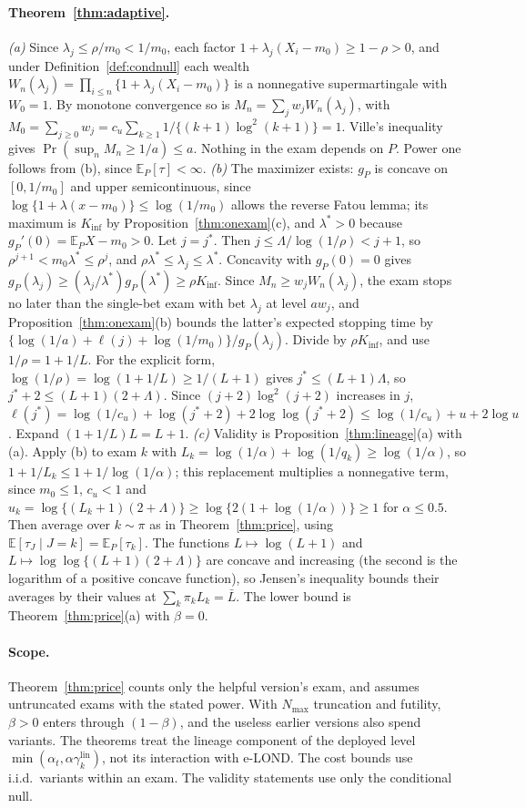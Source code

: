\paragraph{Theorem~\ref{thm:adaptive}.} \emph{(a)} Since $\lambda_j\le\rho/m_0<1/m_0$, each factor $1+\lambda_j(X_i-m_0)\ge1-\rho>0$, and under Definition~\ref{def:condnull} each wealth $W_n(\lambda_j)=\prod_{i\le n}\{1+\lambda_j(X_i-m_0)\}$ is a nonnegative supermartingale with $W_0=1$. By monotone convergence so is $M_n=\sum_jw_jW_n(\lambda_j)$, with $M_0=\sum_{j\ge0}w_j=c_u\sum_{k\ge1}1/\{(k+1)\log^2(k+1)\}=1$. Ville's inequality gives $\Pr(\sup_nM_n\ge1/a)\le a$. Nothing in the exam depends on $P$. Power one follows from (b), since $\mathbb E_P[\tau]<\infty$.
\emph{(b)} The maximizer exists: $g_P$ is concave on $[0,1/m_0]$ and upper semicontinuous, since $\log\{1+\lambda(x-m_0)\}\le\log(1/m_0)$ allows the reverse Fatou lemma; its maximum is $K_{\inf}$ by Proposition~\ref{thm:onexam}(c), and $\lambda^*>0$ because $g_P'(0)=\mathbb E_PX-m_0>0$. Let $j=j^*$. Then $j\le\Lambda/\log(1/\rho)<j+1$, so $\rho^{j+1}<m_0\lambda^*\le\rho^{j}$, and $\rho\lambda^*\le\lambda_j\le\lambda^*$. Concavity with $g_P(0)=0$ gives $g_P(\lambda_j)\ge(\lambda_j/\lambda^*)g_P(\lambda^*)\ge\rho K_{\inf}$. Since $M_n\ge w_jW_n(\lambda_j)$, the exam stops no later than the single-bet exam with bet $\lambda_j$ at level $aw_j$, and Proposition~\ref{thm:onexam}(b) bounds the latter's expected stopping time by $\{\log(1/a)+\ell(j)+\log(1/m_0)\}/g_P(\lambda_j)$. Divide by $\rho K_{\inf}$, and use $1/\rho=1+1/L$. For the explicit form, $\log(1/\rho)=\log(1+1/L)\ge1/(L+1)$ gives $j^*\le(L+1)\Lambda$, so $j^*+2\le(L+1)(2+\Lambda)$. Since $(j+2)\log^2(j+2)$ increases in $j$, $\ell(j^*)=\log(1/c_u)+\log(j^*+2)+2\log\log(j^*+2)\le\log(1/c_u)+u+2\log u$. Expand $(1+1/L)L=L+1$.
\emph{(c)} Validity is Proposition~\ref{thm:lineage}(a) with (a). Apply (b) to exam $k$ with $L_k=\log(1/\alpha)+\log(1/q_k)\ge\log(1/\alpha)$, so $1+1/L_k\le1+1/\log(1/\alpha)$; this replacement multiplies a nonnegative term, since $m_0\le1$, $c_u<1$ and $u_k=\log\{(L_k+1)(2+\Lambda)\}\ge\log\{2(1+\log(1/\alpha))\}\ge1$ for $\alpha\le0.5$. Then average over $k\sim\pi$ as in Theorem~\ref{thm:price}, using $\mathbb E[\tau_J\mid J=k]=\mathbb E_P[\tau_k]$. The functions $L\mapsto\log(L+1)$ and $L\mapsto\log\log\{(L+1)(2+\Lambda)\}$ are concave and increasing (the second is the logarithm of a positive concave function), so Jensen's inequality bounds their averages by their values at $\sum_k\pi_kL_k=\bar L$. The lower bound is Theorem~\ref{thm:price}(a) with $\beta=0$.

\paragraph{Scope.} Theorem~\ref{thm:price} counts only the helpful version's exam, and assumes untruncated exams with the stated power. With $N_{\max}$ truncation and futility, $\beta>0$ enters through $(1-\beta)$, and the useless earlier versions also spend variants. The theorems treat the lineage component of the deployed level $\min(\alpha_t,\alpha\gamma^{\text{lin}}_k)$, not its interaction with e-LOND. The cost bounds use i.i.d.\ variants within an exam. The validity statements use only the conditional null.
